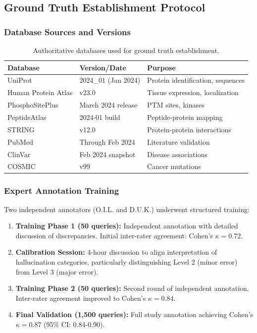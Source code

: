 \documentclass[11pt,a4paper]{article}
\begin{document}
\subsection{Ground Truth Establishment Protocol}

\subsubsection{Database Sources and Versions}

\begin{table}[H]
\centering
\begin{tabular}{lll}
\toprule
\textbf{Database} & \textbf{Version/Date} & \textbf{Purpose} \\
\midrule
UniProt & 2024\_01 (Jan 2024) & Protein identification, sequences \\
Human Protein Atlas & v23.0 & Tissue expression, localization \\
PhosphoSitePlus & March 2024 release & PTM sites, kinases \\
PeptideAtlas & 2024-01 build & Peptide-protein mapping \\
STRING & v12.0 & Protein-protein interactions \\
PubMed & Through Feb 2024 & Literature validation \\
ClinVar & Feb 2024 snapshot & Disease associations \\
COSMIC & v99 & Cancer mutations \\
\bottomrule
\end{tabular}
\caption{Authoritative databases used for ground truth establishment.}
\end{table}

\subsubsection{Expert Annotation Training}

Two independent annotators (O.I.L. and D.U.K.) underwent structured training:

\begin{enumerate}
    \item \textbf{Training Phase 1 (50 queries):} Independent annotation with detailed discussion of discrepancies. Initial inter-rater agreement: Cohen's $\kappa = 0.72$.

    \item \textbf{Calibration Session:} 4-hour discussion to align interpretation of hallucination categories, particularly distinguishing Level 2 (minor error) from Level 3 (major error).

    \item \textbf{Training Phase 2 (50 queries):} Second round of independent annotation. Inter-rater agreement improved to Cohen's $\kappa = 0.84$.

    \item \textbf{Final Validation (1,500 queries):} Full study annotation achieving Cohen's $\kappa = 0.87$ (95\% CI: 0.84-0.90).
\end{enumerate}
\end{document}
